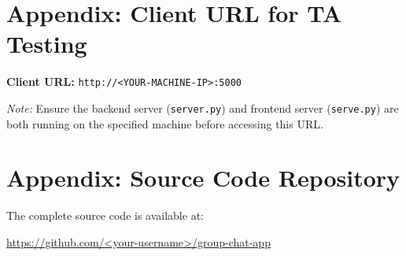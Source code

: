 \documentclass[12pt, a4paper]{article}
\begin{document}
\newpage
\appendix
\section{Appendix: Client URL for TA Testing}

\begin{center}
    \large
    \textbf{Client URL:} \texttt{http://<YOUR-MACHINE-IP>:5000}
\end{center}

\textit{Note:} Ensure the backend server (\texttt{server.py}) and frontend server (\texttt{serve.py}) are both running on the specified machine before accessing this URL.


\section{Appendix: Source Code Repository}

The complete source code is available at:
\begin{center}
    \url{https://github.com/<your-username>/group-chat-app}
\end{center}
\end{document}
